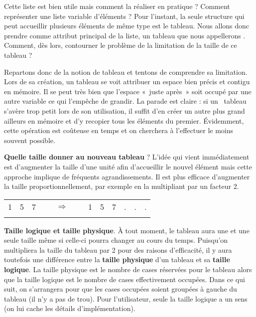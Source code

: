 Cette liste est bien utile mais comment la réaliser en pratique ?
Comment représenter une liste variable d’éléments ? Pour
l'instant, la seule structure qui peut accueillir
plusieurs éléments de même type est le tableau. Nous allons donc
prendre comme attribut principal de la liste, un tableau que nous
appellerons . Comment, dès lors, contourner
le problème de la limitation de la taille de ce tableau ?

Repartons donc de la notion de tableau et tentons de comprendre sa
limitation. Lors de sa création, un tableau se voit attribuer un espace
bien précis et contigu en mémoire. Il se peut très bien que
l'espace «~juste après~» soit occupé par une autre
variable ce qui l'empêche de grandir. La parade est
claire : si un \ tableau s’avère trop petit lors de son utilisation, il
suffit d’en créer un autre plus grand ailleurs en mémoire et d’y
recopier tous les éléments du premier. Évidemment, cette opération est
coûteuse en temps et on cherchera à l’effectuer le moins souvent
possible.

\textbf{Quelle taille donner au nouveau tableau} ? L’idée qui vient
immédiatement est d’augmenter la taille d’une unité afin d’accueillir
le nouvel élément mais cette approche implique de fréquents
agrandissements. Il est plus efficace d’augmenter la taille
proportionnellement, par exemple en la multipliant par un facteur 2.

\begin{center}
\begin{tabular}{|m{0.259cm}|m{0.259cm}|m{0.259cm}|m{0.087999985cm}m{0.46000004cm}m{0.087999985cm}|m{0.25300002cm}|m{0.259cm}|m{0.259cm}|m{0.15299998cm}|m{0.15299998cm}|m{0.17cm}|}
\hhline{---~~~------}
 1 &
 5 &
 7 &
~
 &
 ${\Rightarrow}$ &
~
 &
 1 &
 5 &
 7 &
 . &
 . &
 .\\\hhline{---~~~------}
\end{tabular}
\end{center}


\textbf{Taille logique et taille physique}. À tout moment, le tableau
aura une et une seule taille même si celle-ci pourra changer au cours
du temps. Puisqu’on multipliera la taille du tableau par 2 pour des
raisons d’efficacité, il y aura toutefois une différence entre la
\textbf{taille physique} d’un tableau et sa \textbf{taille logique}. La
taille physique est le nombre de cases réservées pour le tableau alors
que la taille logique est le nombre de cases effectivement occupées.
Dans ce qui suit, on s'arrangera pour que les cases
occupées soient groupées à gauche du tableau (il n'y a
pas de trou). Pour l’utilisateur, seule la taille logique a un sens (on
lui cache les détails d’implémentation).

